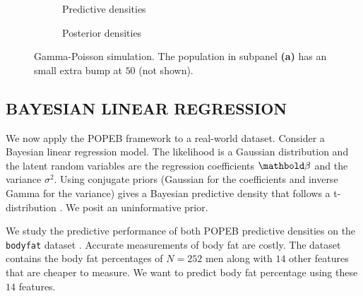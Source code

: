 
\begin{figure}[tb]
\centering
\hspace*{1pt}
\begin{subfigure}[b]{0.45\textwidth}
  
  \vspace*{-16pt}
  \caption{Predictive densities}
  \label{subfig:gamma_poisson_A}
\end{subfigure}

\vspace*{12pt}
\begin{subfigure}[b]{0.45\textwidth}
  
  \vspace*{-16pt}
  \caption{Posterior densities}
  \label{subfig:gamma_poisson_B}
\end{subfigure}

\caption{Gamma-Poisson simulation. The population in subpanel \textbf{(a)} has
an small extra bump at $50$ (not shown).}
\vspace*{-10pt}
\label{fig:gamma_poisson_multiple}
\end{figure}


\subsection{BAYESIAN LINEAR REGRESSION}

We now apply the \gls{POPEB} framework to a real-world
dataset. Consider a Bayesian linear regression model. The likelihood is
a Gaussian distribution and the latent random variables are the regression
coefficients $\mbbeta$ and the variance $\sigma^2$. Using conjugate
priors (Gaussian for the coefficients and inverse Gamma for the variance)
gives a Bayesian predictive density that follows a t-distribution
\citep{murphy2012machine}.
We posit an uninformative prior.

We study the predictive performance of both \gls{POPEB} predictive densities on
the \texttt{bodyfat} dataset \citep{bodyfat}. Accurate measurements of body fat
are costly. The dataset contains the body fat percentages of $N=252$ men along
with $14$ other features that are cheaper to measure. We want to predict
body fat percentage using these $14$ features.

